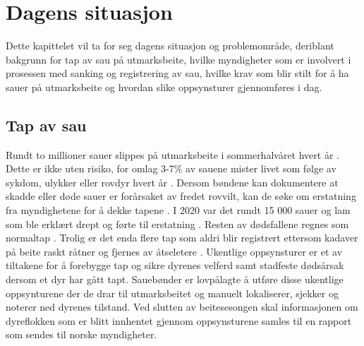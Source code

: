\chapter{Dagens situasjon} \label{bakgrunn}
 Dette kapittelet vil ta for seg dagens situasjon og problemområde, deriblant bakgrunn for tap av sau på utmarksbeite, hvilke myndigheter som er involvert i prosessen med sanking og registrering av sau, hvilke krav som blir stilt for å ha sauer på utmarksbeite og hvordan slike oppsynsturer gjennomføres i dag. 

\section{Tap av sau}
Rundt to millioner sauer slippes på utmarksbeite i sommerhalvåret hvert år \cite[~s.1]{HansenTap2015} \cite{DyrebeskyttelsenNorgeTapBeite}. Dette er ikke uten risiko, for omlag 3-7\% av sauene mister livet som følge av sykdom, ulykker eller rovdyr hvert år \cite[~s.45]{Mattilsynet2019Arsrapport2019}. Dersom bøndene kan dokumentere at skadde eller døde sauer er forårsaket av fredet rovvilt, kan de søke om erstatning fra myndighetene for å dekke tapene \cite{2014ForskriftRovvilt, MiljdirektoratetErstatningRovvilt}. I 2020 var det rundt 15 000 sauer og lam som ble erklært drept og førte til erstatning \cite{Miljdirektoratet2020TapFr}. Resten av dødsfallene regnes som normaltap \cite{2014ForskriftRovvilt}. Trolig er det enda flere tap som aldri blir registrert ettersom kadaver på beite raskt råtner og fjernes av åtseletere \cite{Bakke2006TapRovdyr}. Ukentlige oppsynsturer er et av tiltakene for å forebygge tap og sikre dyrenes velferd samt stadfeste dødsårsak dersom et dyr har gått tapt. Sauebønder er lovpålagte å utføre disse ukentlige oppsynturene der de drar til utmarksbeitet og manuelt lokaliserer, sjekker og noterer ned dyrenes tilstand. Ved slutten av beitesesongen skal informasjonen om dyreflokken som er blitt innhentet gjennom oppsynsturene samles til en rapport som sendes til norske myndigheter. 

